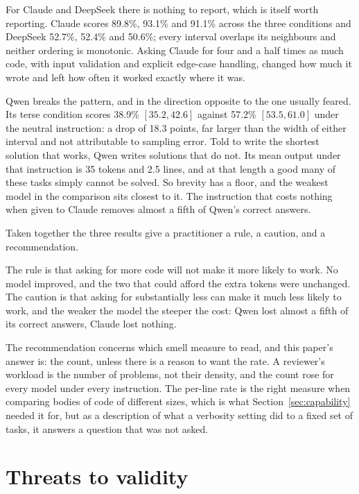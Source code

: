 \documentclass[10pt,a4paper,twocolumn]{article}
\begin{document}
For Claude and DeepSeek there is nothing to report, which is itself worth
reporting. Claude scores 89.8\%, 93.1\% and 91.1\% across the three conditions and
DeepSeek 52.7\%, 52.4\% and 50.6\%; every interval overlaps its neighbours and
neither ordering is monotonic. Asking Claude for four and a half times as much
code, with input validation and explicit edge-case handling, changed how much it
wrote and left how often it worked exactly where it was.

Qwen breaks the pattern, and in the direction opposite to the one usually
feared. Its terse condition scores 38.9\% $[35.2, 42.6]$ against 57.2\% $[53.5, 61.0]$ under the
neutral instruction: a drop of 18.3 points, far larger than the width of either
interval and not attributable to sampling error. Told to write the shortest
solution that works, Qwen writes solutions that do not. Its mean output under
that instruction is 35 tokens and 2.5 lines, and at that length a good many of
these tasks simply cannot be solved. So brevity has a floor, and the weakest
model in the comparison sits closest to it. The instruction that costs nothing
when given to Claude removes almost a fifth of Qwen's correct answers.

Taken together the three results give a practitioner a rule, a caution, and a
recommendation.

The rule is that asking for more code will not make it more likely to work. No
model improved, and the two that could afford the extra tokens were unchanged.
The caution is that asking for substantially less can make it much less likely to
work, and the weaker the model the steeper the cost: Qwen lost almost a fifth
of its correct answers, Claude lost nothing.

The recommendation concerns which smell measure to read, and this paper's answer
is: the count, unless there is a reason to want the rate. A reviewer's workload
is the number of problems, not their density, and the count rose for every model
under every instruction. The per-line rate is the right measure when comparing
bodies of code of different sizes, which is what Section~\ref{sec:capability}
needed it for, but as a description of what a verbosity setting did to a fixed
set of tasks, it answers a question that was not asked.





\section{Threats to validity}
\label{sec:threats}
\end{document}
